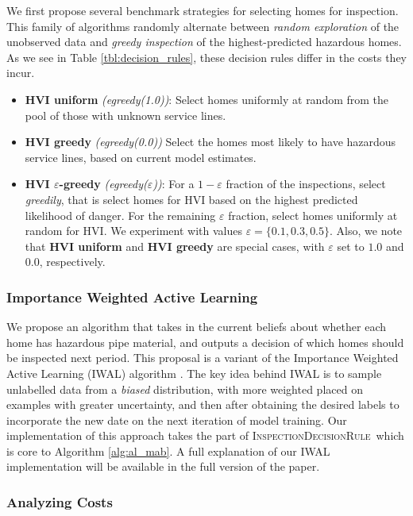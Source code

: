 \documentclass[sigconf]{acmart}
\def\druleHVI{\textsc{InspectionDecisionRule}\xspace}
\begin{document}
We first propose several benchmark strategies for selecting homes for inspection. This family of algorithms randomly alternate between \emph{random exploration} of the unobserved data and \emph{greedy inspection} of the highest-predicted hazardous homes. As we see in Table \ref{tbl:decision_rules}, these decision rules differ in the costs they incur.
\begin{itemize}
\item \textbf{HVI uniform} \emph{(egreedy(1.0))}: Select homes uniformly at random from the pool of those with unknown service lines.
\item \textbf{HVI greedy} \emph{(egreedy(0.0))} Select the homes most likely to have hazardous service lines, based on current model estimates.
\item \textbf{HVI $\varepsilon$-greedy}  \emph{(egreedy($\varepsilon$))}:  For a $1-\varepsilon$ fraction of the inspections, select \emph{greedily}, that is select homes for HVI based on the highest predicted likelihood of danger. For the remaining $\varepsilon$ fraction, select homes uniformly at random for HVI.  We experiment with values $\varepsilon = \{0.1,0.3,0.5\}$. Also, we note that \textbf{HVI uniform} and \textbf{HVI greedy} are special cases, with $\varepsilon$ set to $1.0$ and $0.0$, respectively.
\end{itemize}

\subsubsection{Importance Weighted Active Learning}

We propose an algorithm that takes in the current beliefs about whether each home has hazardous pipe material, and outputs a decision of which homes should be inspected next period. This proposal is a variant of the Importance Weighted Active Learning (IWAL) algorithm \citep{beygelzimer2009importance}. The key idea behind IWAL is to sample unlabelled data from a \emph{biased} distribution, with more weighted placed on examples with greater uncertainty, and then after obtaining the desired labels to incorporate the new date on the next iteration of model training. Our implementation of this approach takes the part of \druleHVI\ which is core to Algorithm \ref{alg:al_mab}. A full explanation of our \textsc{IWAL} implementation will be available in the full version of the paper.

\subsubsection{Analyzing Costs}
\end{document}
